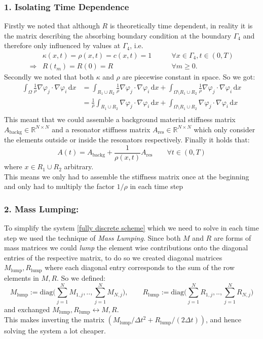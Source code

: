 \documentclass{article}
\begin{document}
\subsubsection*{1. Isolating Time Dependence}
Firstly we noted that although $R$ is theoretically time dependent, in reality it is the matrix describing the absorbing boundary condition at the boundary $\Gamma_4$ and therefore only influenced by values at $\Gamma_4$, i.e.
\begin{align*}
	&\kappa(x,t) = \rho(x,t) = c(x,t) = 1\qquad &\forall 
	x \in \Gamma_4, t \in (0,T) \\
	\Rightarrow &R(t_m) = R(0) = R \qquad &\forall m\geq 0.
\end{align*}
Secondly we noted that both $\kappa$ and $\rho$ are piecewise constant in space. So we got:
\begin{align*}
 	\int_{\Omega} \frac{1}{\rho} \nabla \varphi_j 
 	\cdot \nabla \varphi_i \,\text{d}x &=
 	\int_{R_1 \cup R_2} \frac{1}{\rho} \nabla \varphi_j 
 	\cdot \nabla \varphi_i \,\text{d}x +
 	\int_{\Omega\setminus R_1 \cup R_2} \frac{1}{\rho} 
 	\nabla \varphi_j 
 	\cdot \nabla \varphi_i \,\text{d}x \\ 	
 	&=
 	\frac{1}{\rho}\int_{R_1 \cup R_2} \nabla \varphi_j 
 	\cdot \nabla \varphi_i \,\text{d}x +
 	\int_{\Omega\setminus R_1 \cup R_2}
 	\nabla \varphi_j 
 	\cdot \nabla \varphi_i \,\text{d}x  	\\
\end{align*}
This meant that we could assemble a background material stiffness matrix $A_{\text{backg}}\in \mathbb{R}^{N\times N}$ and a resonator stiffness matrix $A_{\text{res}}\in \mathbb{R}^{N\times N}$ which only consider the elements outside or inside the resonators respectively. Finally it holds that:
\[
	A(t) = A_{\text{backg}} + \frac{1}{\rho (x,t)} A_{\text{res}}
	\qquad \forall t \in (0,T)
\]
where  $x \in R_1  \cup R_2$ arbitrary. \\
This means we only had to assemble the stiffness matrix once at the beginning and only had to multiply the factor $1/\rho$ in each time step

\subsubsection*{2. Mass Lumping:}
To simplify the system \eqref{fully discrete scheme} which we need to solve in each time step we used the technique of \emph{Mass Lumping}. Since both $M$ and $R$ are forms of mass matrices we could \emph{lump} the element wise contributions onto the diagonal entries of the respective matrix, to do so we created diagonal matrices $M_{\text{lump}},R_{\text{lump}}$ where each diagonal entry corresponds to the sum of the row elements in $M,R$. So we defined:
\[
	M_{\text{lump}} := \text{diag}\Big(\sum_{j=1}^N M_{1,j},..,
	\sum_{j=1}^N M_{N,j}\Big), \qquad
	R_{\text{lump}} := \text{diag}\Big(\sum_{j=1}^N R_{1,j},..,
	\sum_{j=1}^N R_{N,j}\Big)	
\]
and exchanged $M_{\text{lump}},R_{\text{lump}} \leftrightarrow M,R$. \\
This makes inverting the matrix $(M_{\text{lump}}/\Delta t^2 + R_{\text{lump}}/(2 \Delta t))$, and hence solving the system a lot cheaper.
\end{document}

